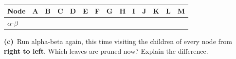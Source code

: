 \documentclass[11pt,a4paper]{article}
\newcommand{\subq}[1]{\par\smallskip\noindent\textbf{#1}\ }
\begin{document}
\begin{center}\small \begin{tabular}{|l|c|c|c|c|c|c|c|c|c|c|c|c|c|}\hline
\textbf{Node} & \textbf{A} & \textbf{B} & \textbf{C} & \textbf{D} & \textbf{E} & \textbf{F} & \textbf{G} & \textbf{H} & \textbf{I} & \textbf{J} & \textbf{K} & \textbf{L} & \textbf{M}\\ \hline
$\alpha$-$\beta$ & \phantom{00} & \phantom{00} & \phantom{00} & \phantom{00} & \phantom{00} & \phantom{00} & \phantom{00} & \phantom{00} & \phantom{00} & \phantom{00} & \phantom{00} & \phantom{00} & \phantom{00}\\[1.5mm] \hline
\end{tabular}\end{center}\begin{ansbox}[height=4.0cm]\end{ansbox}
\subq{(c)}Run alpha-beta again, this time visiting the children of every node from \textbf{right to left}. Which leaves are pruned now? Explain the difference.
\begin{ansbox}[height=4.0cm]\end{ansbox}
\clearpage
\end{document}
